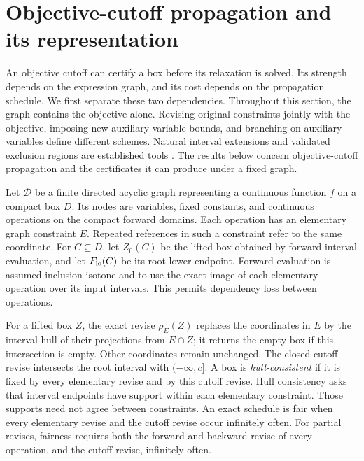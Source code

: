 \section{Objective-cutoff propagation and its representation}
\label{sec:propagation}

An objective cutoff can certify a box before its relaxation is solved. Its
strength depends on the expression graph, and its cost depends on the
propagation schedule. We first separate these two dependencies. Throughout
this section, the graph contains the objective alone. Revising original
constraints jointly with the objective, imposing new auxiliary-variable
bounds, and branching on auxiliary variables define different schemes.
Natural interval extensions and validated exclusion regions are established
tools \citep{schichlMarkotNeumaier2014ExclusionRegions}. The results below
concern objective-cutoff propagation and the certificates it can produce
under a fixed graph.

Let $\mathcal D$ be a finite directed acyclic graph representing a continuous
function $f$ on a compact box $D$. Its nodes are variables, fixed constants,
and continuous operations on the compact forward domains. Each operation
has an elementary graph constraint $E$. Repeated references in such a
constraint refer to the same coordinate. For $C\subseteq D$, let $Z_0(C)$
be the lifted box obtained by forward interval evaluation, and let
$F_{\rm lo}(C)$ be its root lower endpoint. Forward evaluation is assumed
inclusion isotone and to use the exact image of each elementary operation
over its input intervals. This permits dependency loss between operations.

For a lifted box $Z$, the exact revise $\rho_E(Z)$ replaces the coordinates
in $E$ by the interval hull of their projections from $E\cap Z$; it returns
the empty box if this intersection is empty. Other coordinates remain
unchanged. The closed cutoff revise intersects the root interval with
$(-\infty,c]$. A box is \emph{hull-consistent} if it is fixed by every
elementary revise and by this cutoff revise. Hull consistency asks that
interval endpoints have support within each elementary constraint. Those
supports need not agree between constraints.
An exact schedule is fair when every elementary revise and the cutoff
revise occur infinitely often. For partial revises, fairness requires both
the forward and backward revise of every operation, and the cutoff revise,
infinitely often.

